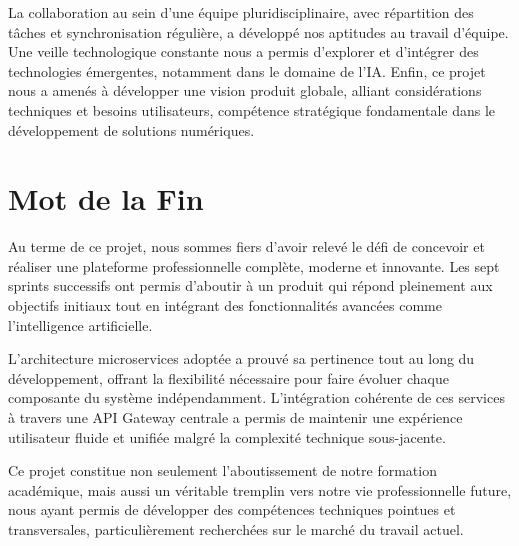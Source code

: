 La collaboration au sein d'une équipe pluridisciplinaire, avec répartition des tâches et synchronisation régulière, a développé nos aptitudes au travail d'équipe. Une veille technologique constante nous a permis d'explorer et d'intégrer des technologies émergentes, notamment dans le domaine de l'IA. Enfin, ce projet nous a amenés à développer une vision produit globale, alliant considérations techniques et besoins utilisateurs, compétence stratégique fondamentale dans le développement de solutions numériques.

\section{Mot de la Fin}
Au terme de ce projet, nous sommes fiers d'avoir relevé le défi de concevoir et réaliser une plateforme professionnelle complète, moderne et innovante. Les sept sprints successifs ont permis d'aboutir à un produit qui répond pleinement aux objectifs initiaux tout en intégrant des fonctionnalités avancées comme l'intelligence artificielle.

L'architecture microservices adoptée a prouvé sa pertinence tout au long du développement, offrant la flexibilité nécessaire pour faire évoluer chaque composante du système indépendamment. L'intégration cohérente de ces services à travers une API Gateway centrale a permis de maintenir une expérience utilisateur fluide et unifiée malgré la complexité technique sous-jacente.

Ce projet constitue non seulement l'aboutissement de notre formation académique, mais aussi un véritable tremplin vers notre vie professionnelle future, nous ayant permis de développer des compétences techniques pointues et transversales, particulièrement recherchées sur le marché du travail actuel. 